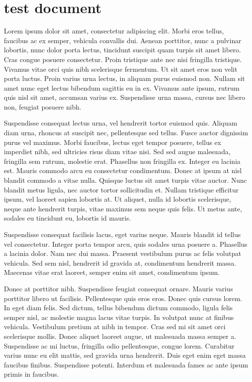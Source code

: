 \documentclass{jamk-report}
\begin{document}
\section{test document}


Lorem ipsum dolor sit amet, consectetur adipiscing elit. Morbi
eros tellus, faucibus ac ex semper, vehicula convallis dui. Aenean
porttitor, nunc a pulvinar lobortis, nunc dolor porta lectus,
tincidunt suscipit quam turpis sit amet libero. Cras congue
posuere consectetur. Proin tristique ante nec nisi fringilla
tristique. Vivamus vitae orci quis nibh scelerisque fermentum. Ut
sit amet eros non velit porta luctus. Proin varius urna lectus, in
aliquam purus euismod non. Nullam sit amet nunc eget lectus
bibendum sagittis eu in ex. Vivamus ante ipsum, rutrum quis nisl
sit amet, accumsan varius ex. Suspendisse urna massa, cursus nec
libero non, feugiat posuere nibh.

Suspendisse consequat lectus urna, vel hendrerit tortor euismod
quis. Aliquam diam urna, rhoncus at suscipit nec, pellentesque sed
tellus. Fusce auctor dignissim purus vel maximus. Morbi faucibus,
lectus eget tempor posuere, tellus ex imperdiet nibh, sed
ultricies risus diam vitae nisi. Sed sed augue malesuada,
fringilla sem rutrum, molestie erat. Phasellus non fringilla ex.
Integer eu lacinia est. Mauris commodo arcu eu consectetur
condimentum. Donec at ipsum at nisl blandit commodo a vitae nulla.
Quisque luctus sit amet turpis vitae auctor. Nunc blandit metus
ligula, nec auctor tortor sollicitudin et. Nullam tristique
efficitur ipsum, vel laoreet sapien lobortis at. Ut aliquet, nulla
id lobortis scelerisque, neque ante hendrerit turpis, vitae
maximus sem neque quis felis. Ut metus ante, sodales eu tincidunt
eu, lobortis id mauris.

Suspendisse consequat facilisis lacus, eget varius neque. Mauris
blandit id tellus vel consectetur. Integer porta tempor arcu, quis
sodales urna posuere a. Phasellus a lacinia dolor. Nam nec dui
massa. Praesent vestibulum purus ac felis volutpat vehicula. Sed
sem nisl, hendrerit id gravida at, condimentum hendrerit massa.
Maecenas vitae erat laoreet, semper enim sit amet, condimentum
ipsum.

Donec at porttitor nibh. Suspendisse feugiat consequat ornare.
Mauris varius porttitor libero ut facilisis. Pellentesque quis
eros eros. Donec quis cursus lorem. In eget diam felis. Sed
dictum, tellus bibendum dictum commodo, ligula felis semper nisl,
ac molestie magna lacus vitae turpis. In volutpat nunc at finibus
vehicula. Vestibulum pretium at nibh in tempor. Cras sed mi sit
amet orci scelerisque mollis. Donec aliquet laoreet augue, ut
malesuada massa semper a. Suspendisse ac mi luctus, fringilla odio
pellentesque, congue lorem. Curabitur varius nunc eu elit mattis,
sed gravida urna hendrerit. Duis eget enim eget massa faucibus
finibus. Suspendisse potenti. Interdum et malesuada fames ac ante
ipsum primis in faucibus.
\end{document}
